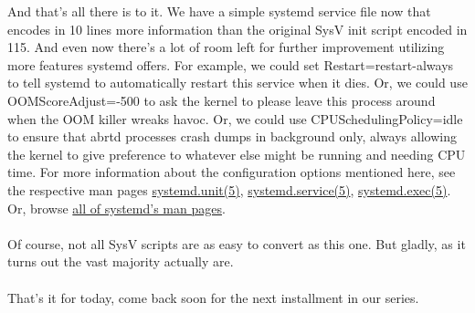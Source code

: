 \documentclass[titlepage]{article}
\begin{document}
And that's all there is to it. We have a simple systemd service file now that encodes in 10 lines more information than the original SysV init script encoded in 115. And even now there's a lot of room left for further improvement utilizing more features systemd offers. For example, we could set Restart=restart-always to tell systemd to automatically restart this service when it dies. Or, we could use OOMScoreAdjust=-500 to ask the kernel to please leave this process around when the OOM killer wreaks havoc. Or, we could use CPUSchedulingPolicy=idle to ensure that abrtd processes crash dumps in background only, always allowing the kernel to give preference to whatever else might be running and needing CPU time.
\newpage
For more information about the configuration options mentioned here, see the respective man pages \href{https://0pointer.de/public/systemd-man/systemd.unit.html}{systemd.unit(5)}, \href{https://0pointer.de/public/systemd-man/systemd.service.html}{systemd.service(5)}, \href{https://0pointer.de/public/systemd-man/systemd.exec.html}{systemd.exec(5)}. Or, browse \href{https://0pointer.de/public/systemd-man/}{all of systemd's man pages}.
\\
\\
Of course, not all SysV scripts are as easy to convert as this one. But gladly, as it turns out the vast majority actually are.
\\
\\
That's it for today, come back soon for the next installment in our series.
\end{document}
